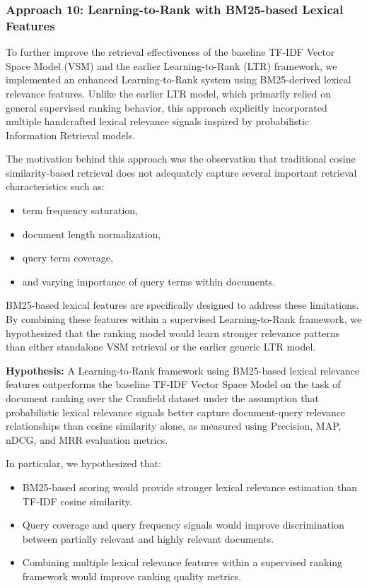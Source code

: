 \documentclass{article}
\begin{document}
\subsubsection{Approach 10: Learning-to-Rank with BM25-based Lexical Features}

To further improve the retrieval effectiveness of the baseline TF-IDF Vector Space Model (VSM) and the earlier Learning-to-Rank (LTR) framework, we implemented an enhanced Learning-to-Rank system using BM25-derived lexical relevance features. Unlike the earlier LTR model, which primarily relied on general supervised ranking behavior, this approach explicitly incorporated multiple handcrafted lexical relevance signals inspired by probabilistic Information Retrieval models.

The motivation behind this approach was the observation that traditional cosine similarity-based retrieval does not adequately capture several important retrieval characteristics such as:
\begin{itemize}
    \item term frequency saturation,
    \item document length normalization,
    \item query term coverage,
    \item and varying importance of query terms within documents.
\end{itemize}

BM25-based lexical features are specifically designed to address these limitations. By combining these features within a supervised Learning-to-Rank framework, we hypothesized that the ranking model would learn stronger relevance patterns than either standalone VSM retrieval or the earlier generic LTR model.

\textbf{Hypothesis:} A Learning-to-Rank framework using BM25-based lexical relevance features outperforms the baseline TF-IDF Vector Space Model on the task of document ranking over the Cranfield dataset under the assumption that probabilistic lexical relevance signals better capture document-query relevance relationships than cosine similarity alone, as measured using Precision, MAP, nDCG, and MRR evaluation metrics.

In particular, we hypothesized that:
\begin{itemize}
    \item BM25-based scoring would provide stronger lexical relevance estimation than TF-IDF cosine similarity.
    \item Query coverage and query frequency signals would improve discrimination between partially relevant and highly relevant documents.
    \item Combining multiple lexical relevance features within a supervised ranking framework would improve ranking quality metrics.
\end{itemize}
\end{document}

